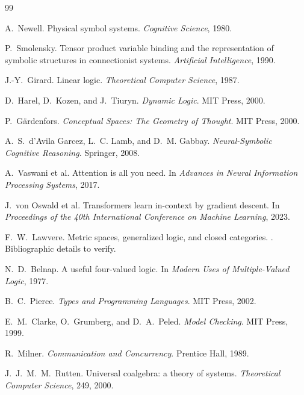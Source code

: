 \documentclass[11pt]{article}
\theoremstyle{definition}
\theoremstyle{remark}
\begin{document}
\begin{thebibliography}{99}

A.~Newell.
\newblock Physical symbol systems.
\newblock \emph{Cognitive Science}, 1980.

P.~Smolensky.
\newblock Tensor product variable binding and the representation of symbolic structures in connectionist systems.
\newblock \emph{Artificial Intelligence}, 1990.

J.-Y.~Girard.
\newblock Linear logic.
\newblock \emph{Theoretical Computer Science}, 1987.

D.~Harel, D.~Kozen, and J.~Tiuryn.
\newblock \emph{Dynamic Logic}.
\newblock MIT Press, 2000.

P.~G\"ardenfors.
\newblock \emph{Conceptual Spaces: The Geometry of Thought}.
\newblock MIT Press, 2000.

A.~S.~d'Avila Garcez, L.~C. Lamb, and D.~M. Gabbay.
\newblock \emph{Neural-Symbolic Cognitive Reasoning}.
\newblock Springer, 2008.

A.~Vaswani et al.
\newblock Attention is all you need.
\newblock In \emph{Advances in Neural Information Processing Systems}, 2017.

J.~von Oswald et al.
\newblock Transformers learn in-context by gradient descent.
\newblock In \emph{Proceedings of the 40th International Conference on Machine Learning}, 2023.

F.~W.~Lawvere.
\newblock Metric spaces, generalized logic, and closed categories.
. Bibliographic details to verify.


N.~D.~Belnap.
\newblock A useful four-valued logic.
\newblock In \emph{Modern Uses of Multiple-Valued Logic}, 1977.

B.~C.~Pierce.
\newblock \emph{Types and Programming Languages}.
\newblock MIT Press, 2002.

E.~M.~Clarke, O.~Grumberg, and D.~A.~Peled.
\newblock \emph{Model Checking}.
\newblock MIT Press, 1999.

R.~Milner.
\newblock \emph{Communication and Concurrency}.
\newblock Prentice Hall, 1989.

J.~J.~M.~M.~Rutten.
\newblock Universal coalgebra: a theory of systems.
\newblock \emph{Theoretical Computer Science}, 249, 2000.



\end{thebibliography}
\end{document}
